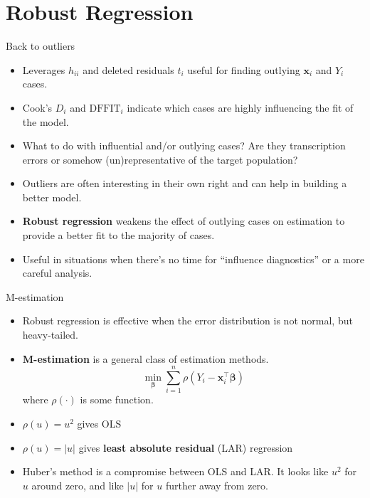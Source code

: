 \documentclass{beamer}
\begin{document}
\section{Robust Regression}
\begin{frame}{Back to outliers}
\begin{itemize}
    \item Leverages $h_{ii}$ and deleted residuals $t_i$ useful for finding outlying $\mathbf{x}_i$ and $Y_i$ cases.
    \item\pause Cook's $D_i$ and $\text{DFFIT}_i$ indicate which cases are highly influencing the fit of the model.
    \item\pause What to do with influential and/or outlying cases? Are they transcription errors or somehow (un)representative of the target population?
    \item\pause Outliers are often interesting in their own right and can help in building a better model.
    \item\pause \textbf{Robust regression} weakens the effect of outlying cases on estimation to provide a better fit to the majority of cases.
    \item\pause Useful in situations when there's no time for ``influence diagnostics'' or a more careful analysis.
\end{itemize}
\end{frame}

\begin{frame}{M-estimation}
\begin{itemize}
    \item Robust regression is effective when the error distribution is not normal, but heavy-tailed.
    \item\pause \textbf{M-estimation} is a general class of estimation methods. \pause
    $$
    \min_{\boldsymbol\beta}\sum_{i=1}^n\rho(Y_i-\mathbf{x}_i^\top\boldsymbol\beta)
    $$
    \pause where $\rho(\cdot)$ is some function.
    \item\pause $\rho(u)=u^2$ gives OLS
    \item\pause $\rho(u)=|u|$ gives \textbf{least absolute residual} (LAR) regression
    \item\pause Huber's method is a compromise between OLS and LAR. \pause It looks like $u^2$ for $u$ around zero, and like $|u|$ for $u$ further away from zero.
\end{itemize}
\end{frame}
\end{document}
